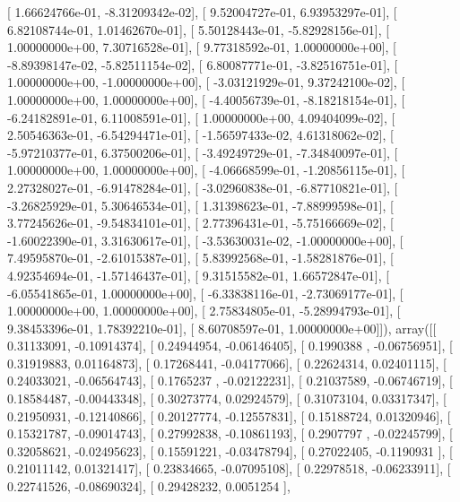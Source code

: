 \documentclass{article}
\begin{document}
       [  1.66624766e-01,  -8.31209342e-02],
       [  9.52004727e-01,   6.93953297e-01],
       [  6.82108744e-01,   1.01462670e-01],
       [  5.50128443e-01,  -5.82928156e-01],
       [  1.00000000e+00,   7.30716528e-01],
       [  9.77318592e-01,   1.00000000e+00],
       [ -8.89398147e-02,  -5.82511154e-02],
       [  6.80087771e-01,  -3.82516751e-01],
       [  1.00000000e+00,  -1.00000000e+00],
       [ -3.03121929e-01,   9.37242100e-02],
       [  1.00000000e+00,   1.00000000e+00],
       [ -4.40056739e-01,  -8.18218154e-01],
       [ -6.24182891e-01,   6.11008591e-01],
       [  1.00000000e+00,   4.09404099e-02],
       [  2.50546363e-01,  -6.54294471e-01],
       [ -1.56597433e-02,   4.61318062e-02],
       [ -5.97210377e-01,   6.37500206e-01],
       [ -3.49249729e-01,  -7.34840097e-01],
       [  1.00000000e+00,   1.00000000e+00],
       [ -4.06668599e-01,  -1.20856115e-01],
       [  2.27328027e-01,  -6.91478284e-01],
       [ -3.02960838e-01,  -6.87710821e-01],
       [ -3.26825929e-01,   5.30646534e-01],
       [  1.31398623e-01,  -7.88999598e-01],
       [  3.77245626e-01,  -9.54834101e-01],
       [  2.77396431e-01,  -5.75166669e-02],
       [ -1.60022390e-01,   3.31630617e-01],
       [ -3.53630031e-02,  -1.00000000e+00],
       [  7.49595870e-01,  -2.61015387e-01],
       [  5.83992568e-01,  -1.58281876e-01],
       [  4.92354694e-01,  -1.57146437e-01],
       [  9.31515582e-01,   1.66572847e-01],
       [ -6.05541865e-01,   1.00000000e+00],
       [ -6.33838116e-01,  -2.73069177e-01],
       [  1.00000000e+00,   1.00000000e+00],
       [  2.75834805e-01,  -5.28994793e-01],
       [  9.38453396e-01,   1.78392210e-01],
       [  8.60708597e-01,   1.00000000e+00]]), array([[ 0.31133091, -0.10914374],
       [ 0.24944954, -0.06146405],
       [ 0.1990388 , -0.06756951],
       [ 0.31919883,  0.01164873],
       [ 0.17268441, -0.04177066],
       [ 0.22624314,  0.02401115],
       [ 0.24033021, -0.06564743],
       [ 0.1765237 , -0.02122231],
       [ 0.21037589, -0.06746719],
       [ 0.18584487, -0.00443348],
       [ 0.30273774,  0.02924579],
       [ 0.31073104,  0.03317347],
       [ 0.21950931, -0.12140866],
       [ 0.20127774, -0.12557831],
       [ 0.15188724,  0.01320946],
       [ 0.15321787, -0.09014743],
       [ 0.27992838, -0.10861193],
       [ 0.2907797 , -0.02245799],
       [ 0.32058621, -0.02495623],
       [ 0.15591221, -0.03478794],
       [ 0.27022405, -0.1190931 ],
       [ 0.21011142,  0.01321417],
       [ 0.23834665, -0.07095108],
       [ 0.22978518, -0.06233911],
       [ 0.22741526, -0.08690324],
       [ 0.29428232,  0.0051254 ],
\end{document}
